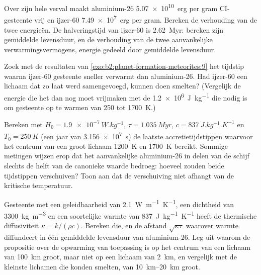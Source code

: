 \begin{exercise}[$\star\star$]\label{exo:b2:planet-formation-meteorites:9}
Over zijn hele verval maakt aluminium-26 \qty{5.07e10}{erg} per gram CI-gesteente
vrij en ijzer-60 \qty{7.49e7}{erg} per gram. Bereken de verhouding van de twee
energieën. De halveringstijd van ijzer-60 is \qty{2.62}{Myr}: bereken zijn gemiddelde levensduur,
en de verhouding van de twee aanvankelijke verwarmingsvermogens, energie gedeeld door gemiddelde levensduur.
\end{exercise}

\begin{exercise}[$\star\star\star$]\label{exo:b2:planet-formation-meteorites:10}
Zoek met de resultaten van \cref{exo:b2:planet-formation-meteorites:9} het tijdstip waarna ijzer-60 gesteente
sneller verwarmt dan aluminium-26. Had ijzer-60 een lichaam dat zo laat werd samengevoegd,
kunnen doen smelten? (Vergelijk de energie die het dan nog moet vrijmaken met de
\qty{1.2e6}{J.kg^{-1}} die nodig is om gesteente op te warmen van \num{250} tot \qty{1700}{K}.)
\end{exercise}

\begin{exercise}[$\star\star\star$]\label{exo:b2:planet-formation-meteorites:11}
Bereken met $H_0 = \qty{1.9e-7}{W.kg^{-1}}$, $\tau = \qty{1.035}{Myr}$,
$c = \qty{837}{J.kg^{-1}.K^{-1}}$ en $T_0 = \qty{250}{K}$ (een jaar van
\qty{3.156e7}{s}) de laatste accretietijdstippen waarvoor het centrum van een
groot lichaam \qty{1200}{K} en \qty{1700}{K} bereikt. Sommige metingen wijzen erop dat
het aanvankelijke aluminium-26 in delen van de schijf slechts de helft van de canonieke waarde bedroeg:
hoeveel zouden beide tijdstippen verschuiven? Toon aan dat de verschuiving niet afhangt van de
kritische temperatuur.
\end{exercise}

\begin{exercise}[$\star\star\star$]\label{exo:b2:planet-formation-meteorites:12}
Gesteente met een geleidbaarheid van \qty{2.1}{W.m^{-1}.K^{-1}}, een dichtheid van
\qty{3300}{kg.m^{-3}} en een soortelijke warmte van \qty{837}{J.kg^{-1}.K^{-1}} heeft
de thermische diffusiviteit $\kappa = k/(\rho c)$. Bereken die, en de afstand
$\sqrt{\kappa\tau}$ waarover warmte diffundeert in één gemiddelde levensduur van aluminium-26.
Leg uit waarom de propositie over de opwarming van toepassing is op het centrum van een lichaam
van \qty{100}{km} groot, maar niet op een lichaam van \qty{2}{km}, en vergelijk met de
kleinste lichamen die konden smelten, van \qtyrange{10}{20}{km} groot.
\end{exercise}

